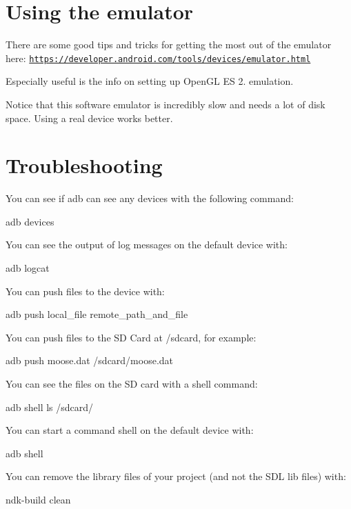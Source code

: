  \section*{Using the emulator }

There are some good tips and tricks for getting the most out of the emulator here\+: \href{https://developer.android.com/tools/devices/emulator.html}{\tt https\+://developer.\+android.\+com/tools/devices/emulator.\+html}

Especially useful is the info on setting up Open\+GL ES 2. emulation.

Notice that this software emulator is incredibly slow and needs a lot of disk space. Using a real device works better.



 \section*{Troubleshooting }

You can see if adb can see any devices with the following command\+: \begin{DoxyVerb}adb devices
\end{DoxyVerb}


You can see the output of log messages on the default device with\+: \begin{DoxyVerb}adb logcat
\end{DoxyVerb}


You can push files to the device with\+: \begin{DoxyVerb}adb push local_file remote_path_and_file
\end{DoxyVerb}


You can push files to the SD Card at /sdcard, for example\+: \begin{DoxyVerb}adb push moose.dat /sdcard/moose.dat
\end{DoxyVerb}


You can see the files on the SD card with a shell command\+: \begin{DoxyVerb}adb shell ls /sdcard/
\end{DoxyVerb}


You can start a command shell on the default device with\+: \begin{DoxyVerb}adb shell
\end{DoxyVerb}


You can remove the library files of your project (and not the S\+DL lib files) with\+: \begin{DoxyVerb}ndk-build clean
\end{DoxyVerb}


